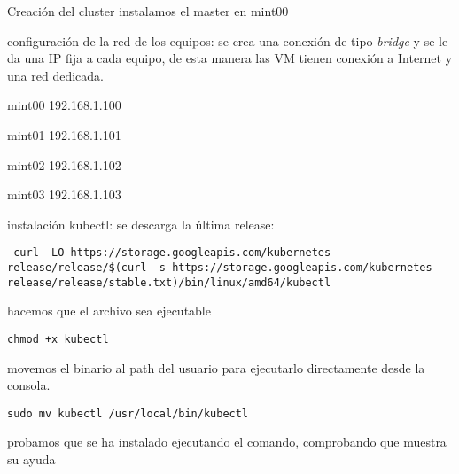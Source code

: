 \documentclass[../main.tex]{subfiles}
\begin{document}
Creación del cluster
instalamos el master en mint00

configuración de la red de los equipos:
se crea una conexión de tipo \textit{bridge }y se le da una IP fija a cada equipo, de esta manera las VM tienen conexión a Internet y una red dedicada.
\begin{list}{·}{}
	\item mint00 192.168.1.100
	\item mint01 192.168.1.101
	\item mint02 192.168.1.102
	\item mint03 192.168.1.103
\end{list}




instalación kubectl:
se descarga la última release:

\begin{lstlisting}
 curl -LO https://storage.googleapis.com/kubernetes-release/release/$(curl -s https://storage.googleapis.com/kubernetes-release/release/stable.txt)/bin/linux/amd64/kubectl
\end{lstlisting}
hacemos que el archivo sea ejecutable

\begin{lstlisting}
chmod +x kubectl
\end{lstlisting}
movemos el binario al path del usuario para ejecutarlo directamente desde la consola.
\lstconsolestyle
\begin{lstlisting}
sudo mv kubectl /usr/local/bin/kubectl
\end{lstlisting}
 
 probamos que se ha instalado ejecutando el comando, comprobando que muestra su ayuda
\end{document}
